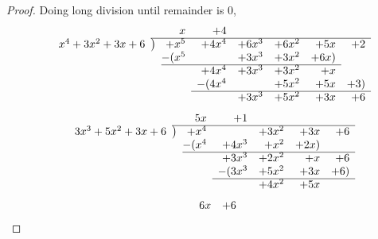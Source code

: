 \documentclass[paper=usletter, fontsize=12pt]{article}
\begin{document}
\begin{enumerate}
\begin{enumerate}
\begin{enumerate}
\begin{proof}
                    Doing long division until remainder is $0$,\\
                    \begin{equation*}
                        \begin{array}{*2r @{\hskip\arraycolsep}c@{\hskip\arraycolsep} *7r}
                            &    &&    x & +4 \\
                            \cline{3-9}
                            & x^4+3x^2+3x+6 &\big)& +x^5 &+4x^4 &+6x^3 &+6x^2 &+5x &+2 \\
                            &    &&  -(x^5 &&+3x^3 &+3x^2 &+6x) \\
                            \cline{4-8}
                            &    &&   &  +4x^4 &+3x^3 &+3x^2 &+x \\
                            &    &&   &  -(4x^4&& +5x^2& +5x& +3) \\
                            \cline{5-9}
                            &    &&    &    & +3x^3 & +5x^2& +3x& +6 \\
                        \end{array}
                    \end{equation*}
                    \begin{equation*}
                        \begin{array}{*2r @{\hskip\arraycolsep}c@{\hskip\arraycolsep} *5r}
                            &    &&    5x & +1 \\
                            \cline{3-8}
                            & 3x^3+5x^2+3x+6 &\big)& +x^4 &&+3x^2 &+3x &+6 \\
                            &    &&  -(x^4 &+4x^3 &+x^2 &+2x) \\
                            \cline{4-8}
                            &    &&   &  +3x^3 &+2x^2 &+x &+6 \\
                            &    &&   &  -(3x^3 &+5x^2 &+3x &+6) \\
                            \cline{5-8}
                            &    &&    &    & +4x^2 & +5x \\
                        \end{array}
                    \end{equation*}
                    \begin{equation*}
                        \begin{array}{*2r @{\hskip\arraycolsep}c@{\hskip\arraycolsep} *5r}
                            &    &&    6x & +6 \\

\end{array}
\end{equation*}
\end{proof}
\end{enumerate}
\end{enumerate}
\end{enumerate}
\end{document}

